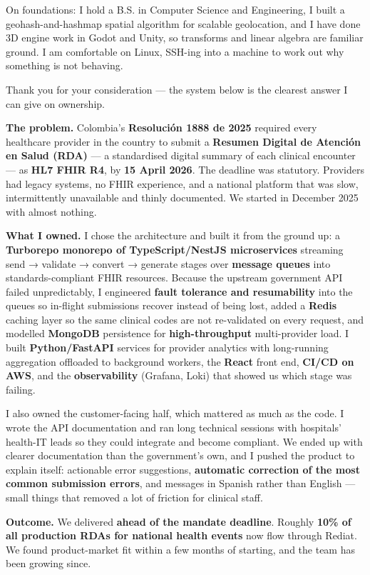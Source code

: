\documentclass[11pt,a4paper]{awesome-cv}
\begin{document}
\begin{cvletter}
On foundations: I hold a B.S. in Computer Science and Engineering, I built a geohash-and-hashmap spatial algorithm for scalable geolocation, and I have done 3D engine work in Godot and Unity, so transforms and linear algebra are familiar ground. I am comfortable on Linux, SSH-ing into a machine to work out why something is not behaving.

Thank you for your consideration --- the system below is the clearest answer I can give on ownership.


\textbf{The problem.} Colombia's \textbf{Resolución 1888 de 2025} required every healthcare provider in the country to submit a \textbf{Resumen Digital de Atención en Salud (RDA)} --- a standardised digital summary of each clinical encounter --- as \textbf{HL7 FHIR R4}, by \textbf{15 April 2026}. The deadline was statutory. Providers had legacy systems, no FHIR experience, and a national platform that was slow, intermittently unavailable and thinly documented. We started in December 2025 with almost nothing.

\textbf{What I owned.} I chose the architecture and built it from the ground up: a \textbf{Turborepo monorepo of TypeScript/NestJS microservices} streaming send → validate → convert → generate stages over \textbf{message queues} into standards-compliant FHIR resources. Because the upstream government API failed unpredictably, I engineered \textbf{fault tolerance and resumability} into the queues so in-flight submissions recover instead of being lost, added a \textbf{Redis} caching layer so the same clinical codes are not re-validated on every request, and modelled \textbf{MongoDB} persistence for \textbf{high-throughput} multi-provider load. I built \textbf{Python/FastAPI} services for provider analytics with long-running aggregation offloaded to background workers, the \textbf{React} front end, \textbf{CI/CD on AWS}, and the \textbf{observability} (Grafana, Loki) that showed us which stage was failing.

I also owned the customer-facing half, which mattered as much as the code. I wrote the API documentation and ran long technical sessions with hospitals' health-IT leads so they could integrate and become compliant. We ended up with clearer documentation than the government's own, and I pushed the product to explain itself: actionable error suggestions, \textbf{automatic correction of the most common submission errors}, and messages in Spanish rather than English --- small things that removed a lot of friction for clinical staff.

\textbf{Outcome.} We delivered \textbf{ahead of the mandate deadline}. Roughly \textbf{10\% of all production RDAs for national health events} now flow through Rediat. We found product-market fit within a few months of starting, and the team has been growing since.

\end{cvletter}

\makeletterclosing
\end{document}
